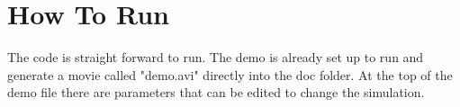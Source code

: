 \documentclass{article}
\begin{document}
\section{How To Run}\label{run}

The code is straight forward to run. The demo is already set up to run and generate a movie called "demo.avi" directly into the doc folder. At the top of the demo file there are parameters that can be edited to change the simulation.



%
%
%
%

\end{document}
